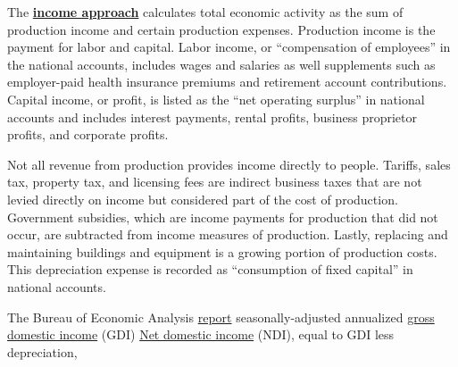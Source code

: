 \documentclass{report}
\begin{document}
\begin{minipage}{1.0\textwidth}
\small The \textbf{\href{https://www.bea.gov/help/glossary/income-approach}{income approach}} calculates total economic activity as the sum of production income and certain production expenses. Production income is the payment for labor and capital. Labor income, or ``compensation of employees'' in the national accounts, includes wages and salaries as well supplements such as employer-paid health insurance premiums and retirement account contributions. Capital income, or profit, is listed as the ``net operating surplus'' in national accounts and includes interest payments, rental profits, business proprietor profits, and corporate profits.

Not all revenue from production provides income directly to people. Tariffs, sales tax, property tax, and licensing fees are indirect business taxes that are not levied directly on income but considered part of the cost of production. Government subsidies, which are income payments for production that did not occur, are subtracted from income measures of production. Lastly, replacing and maintaining buildings and equipment is a growing portion of production costs. This depreciation expense is recorded as ``consumption of fixed capital'' in national accounts.

The Bureau of Economic Analysis \href{https://www.bea.gov/data/gdp/gross-domestic-product}{report} seasonally-adjusted annualized \href{https://www.bea.gov/help/glossary/gross-domestic-income-gdi}{gross domestic income} (GDI)  \href{https://www.bea.gov/help/glossary/net-domestic-income-ndi}{Net domestic income} (NDI), equal to GDI less depreciation, 
\end{minipage}
\vspace{1mm}
\end{document}
